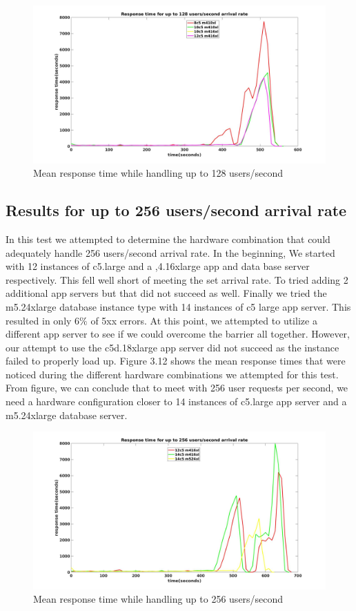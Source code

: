 \begin{figure}[h]
	\centering
	\includegraphics[width=1\textwidth, height=0.5\textheight ]{images/scale128.jpg}
	\caption{Mean response time while handling up to 128 users/second}\label{fig:sqlopt}
\end{figure}



\subsection{Results for up to 256 users/second arrival rate}
In this test we attempted to determine the hardware combination that could adequately handle 256 users/second arrival rate. In the beginning, We started with 12 instances of c5.large and a ,4.16xlarge app and data base server respectively. This fell well short of meeting the set arrival rate. To tried adding 2 additional app servers but that did not succeed as well. Finally we tried the m5.24xlarge database instance type with 14 instances of c5 large app server. This resulted in only $6\%$ of 5xx errors. At this point, we attempted to utilize a different app server to see if we could overcome the barrier all together. However, our attempt to use the c5d.18xlarge app server did not succeed as the instance failed to properly load up. Figure 3.12 shows the mean response times that were noticed during the different hardware combinations we attempted for this test. From figure, we can conclude that to meet with 256 user requests per second, we need a hardware configuration closer to 14 instances of c5.large app server and a m5.24xlarge database server.

\begin{figure}[h]
	\centering
	\includegraphics[width=1\textwidth]{images/scale256.jpg}
	\caption{Mean response time while handling up to 256 users/second}\label{fig:sqlopt}
\end{figure}

